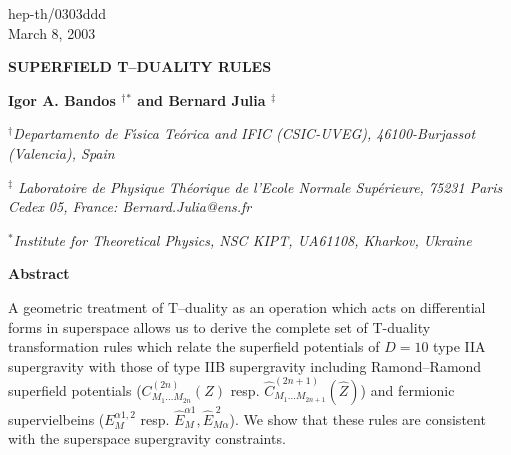 \documentclass[a4paper,11pt]{article}
\begin{document}
\def\a{\alpha}\def\b{\beta}\def\g{\gamma}\def\d{\delta}\def\e{\epsilon }
\def\k{\kappa}\def\l{\lambda}\def\L{\Lambda}\def\s{\sigma}\def\S{\Sigma}
\def\Th{\Theta}\def\th{\theta}\def\om{\omega}\def\Om{\Omega}\def\G{\Gamma}
\def\y{\vartheta}\def\m{\mu}\def\n{\nu}
\renewcommand\baselinestretch{1.2}
\newcommand{\nn}{\nonumber\\}\newcommand{\p}[1]{(\ref{#1})}
\renewcommand{\thefootnote}{\fnsymbol{footnote}}
\thispagestyle{empty} 
\begin{flushright}
hep-th/0303ddd 
\\ March 8, 2003
\end{flushright}

\vspace{3cm}

\begin{center}

{\Large\bf SUPERFIELD T--DUALITY  RULES}




\vspace{0.2cm}
{\bf Igor A. Bandos $^\dagger{}^\ast$ and Bernard Julia $^\ddagger$} 

\vspace{0.5cm}
{\it $^\dagger$Departamento de F\'{\i}sica Te\'orica and IFIC 
(CSIC-UVEG), 
 46100-Burjassot (Valencia), Spain}


\vspace{0.5cm}
{\it $^\ddagger$ Laboratoire de Physique Th\'eorique de l'Ecole Normale 
Sup\'erieure, 75231 Paris Cedex 05, France: Bernard.Julia@ens.fr}

\vspace{0.5cm}
{\it $^\ast$Institute for Theoretical Physics, NSC KIPT, 
UA61108,
Kharkov, Ukraine}  


\vspace{3.0cm}

{\bf Abstract}
\end{center}

A geometric treatment of T--duality as an operation which 
acts on differential forms in superspace 
allows us to derive 
the complete set of T-duality transformation rules which relate
the superfield potentials of $D=10$ type IIA supergravity with those of type 
IIB supergravity including Ramond--Ramond superfield potentials
($C^{(2n)}_{M_1\ldots M_{2n}}(Z)$ resp. $
\hat{C}^{(2n+1)}_{M_1\ldots M_{2n+1}}(\hat{Z})$) and 
fermionic supervielbeins ($E_M^{\alpha 1, 2}$ resp. 
$\hat{E}_M^{\alpha 1}, \hat{E}_{M\alpha}^{\; 2}$). We show that these 
rules are consistent with the superspace supergravity constraints.     
\end{document}
